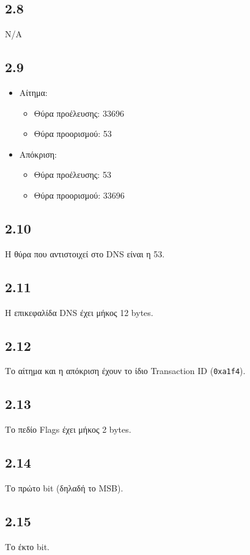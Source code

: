 		\subsection*{2.8} 
			N/A
	
		\subsection*{2.9} 
			\begin{itemize}
				\item Αίτημα:
					\begin{itemize}
						\item Θύρα προέλευσης: 33696
						\item Θύρα προορισμού: 53
					\end{itemize}
				\item Απόκριση:
					\begin{itemize}
						\item Θύρα προέλευσης: 53
						\item Θύρα προορισμού: 33696
					\end{itemize}
			\end{itemize}

		\subsection*{2.10} 
			Η θύρα που αντιστοιχεί στο DNS είναι η 53.

		\subsection*{2.11} 
			Η επικεφαλίδα DNS έχει μήκος 12 bytes. 

		\subsection*{2.12} 
			Το αίτημα και η απόκριση έχουν το ίδιο Transaction ID (\verb|0xa1f4|).

		\subsection*{2.13} 
			Το πεδίο Flags έχει μήκος 2 bytes.

		\subsection*{2.14} 
			Το πρώτο bit (δηλαδή το MSB).

		\subsection*{2.15} 
			Το έκτο bit.
	
